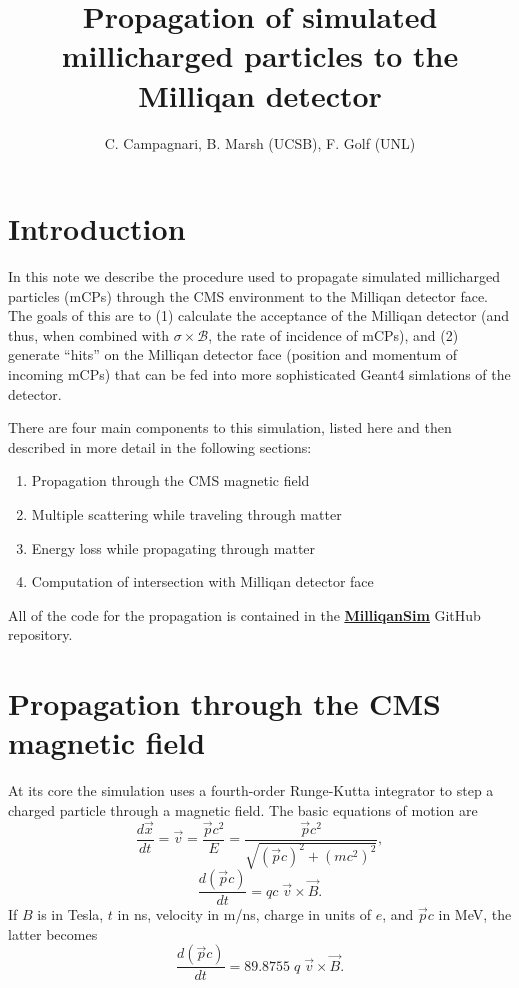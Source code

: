 \documentclass[12pt]{article}
\title{Propagation of simulated millicharged particles to the Milliqan detector}
\author{C. Campagnari, B. Marsh (UCSB), F. Golf (UNL)}
\begin{document}
\maketitle


\section{Introduction}
In this note we describe the procedure used to propagate simulated millicharged
particles (mCPs) through the CMS environment to the Milliqan detector face. The goals 
of this are to (1) calculate the acceptance of the Milliqan detector (and thus,
when combined with $\sigma\times\mathcal{B}$, the rate of incidence of mCPs),
and (2) generate ``hits'' on the Milliqan detector face  (position and momentum of incoming mCPs)
that can be fed into more sophisticated Geant4 simlations of the detector.

There are four main components to this simulation, listed here and then described in more
detail in the following sections:
\begin{enumerate}
\item Propagation through the CMS magnetic field
\item Multiple scattering while traveling through matter
\item Energy loss while propagating through matter
\item Computation of intersection with Milliqan detector face
\end{enumerate}

All of the code for the propagation is contained in the \href{https://github.com/bjmarsh/MilliqanSim}{\underline{\bf MilliqanSim}} GitHub repository.

\section{Propagation through the CMS magnetic field}
At its core the simulation uses a fourth-order Runge-Kutta integrator to step a charged particle
through a magnetic field. The basic equations of motion are
\begin{equation}\label{eq:dxdt}
\frac{d\vec{x}}{dt} = \vec{v} = \frac{\vec{p}c^2}{E} = \frac{\vec{p}c^2}{\sqrt{(\vec{p}c)^2+(mc^2)^2}},
\end{equation}
\[
\frac{d(\vec{p}c)}{dt} = qc\;\vec{v}\times\vec{B}.
\]
If $B$ is in Tesla, $t$ in ns, velocity in m/ns, charge in units of $e$, and $\vec{p}c$ in MeV, the latter becomes
\begin{equation}\label{eq:dpdt}
\frac{d(\vec{p}c)}{dt} = 89.8755\;q\;\vec{v}\times\vec{B}.
\end{equation}
\end{document}

